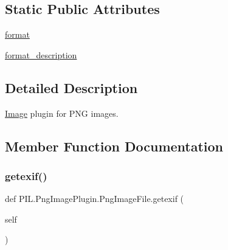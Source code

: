 \subsection*{Static Public Attributes}
\begin{DoxyCompactItemize}
\item 
\hyperlink{classPIL_1_1PngImagePlugin_1_1PngImageFile_a99ed7227e8d2d46e3c9356aac5f53978}{format}
\item 
\hyperlink{classPIL_1_1PngImagePlugin_1_1PngImageFile_a121a52a4c50a13f4f70639a6250f005d}{format\+\_\+description}
\end{DoxyCompactItemize}


\subsection{Detailed Description}
\hyperlink{namespacePIL_1_1Image}{Image} plugin for P\+NG images. 



\subsection{Member Function Documentation}
\mbox{\label{classPIL_1_1PngImagePlugin_1_1PngImageFile_aef2fc57f89244c6698108a2ed31e1cd3}} 
\subsubsection{\texorpdfstring{getexif()}{getexif()}}
{\footnotesize\ttfamily def P\+I\+L.\+Png\+Image\+Plugin.\+Png\+Image\+File.\+getexif (\begin{DoxyParamCaption}\item[{}]{self }\end{DoxyParamCaption})}

\mbox{\label{classPIL_1_1PngImagePlugin_1_1PngImageFile_ad726ff511a5aacbe199437ffa6bc5278}} 
